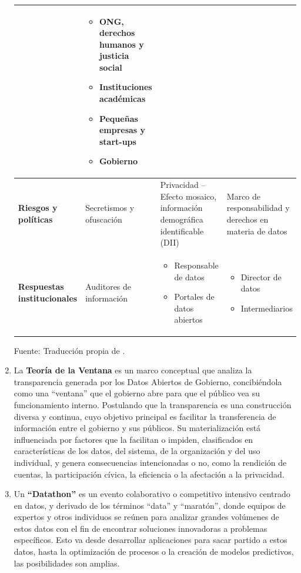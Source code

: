 \begin{enumerate}
\begin{table}[ht]
{\begin{tabular}{|p{3cm}|p{4cm}|p{4cm}|p{5cm}|}
				& 
				\begin{itemize}
					\item ONG, derechos humanos y justicia social
					\item Instituciones académicas
					\item Pequeñas empresas y start-ups
					\item Gobierno
				\end{itemize} \\
				\hline
				\textbf{Riesgos y políticas} & Secretismos y ofuscación & Privacidad -- Efecto mosaico, información demográfica identificable (DII) & Marco de responsabilidad y derechos en materia de datos \\
				\hline
				\textbf{Respuestas institucionales} & Auditores de información & 
				\begin{itemize}
					\item Responsable de datos
					\item Portales de datos abiertos
				\end{itemize}
				& 
				\begin{itemize}
					\item Director de datos
					\item Intermediarios
				\end{itemize} \\
				\hline
			\end{tabular}
		}
		\vspace{0.5em}
		
		\footnotesize Fuente: Traducción propia de \cite{verhulst2020}.
	\end{table}

	\item La \textbf{Teoría de la Ventana} \label{def6} \citep{Matheus03052020} es un marco conceptual que analiza la transparencia generada por los Datos Abiertos de Gobierno, concibiéndola como una ``ventana'' que el gobierno abre para que el público vea su funcionamiento interno. Postulando que la transparencia es una construcción diversa y continua, cuyo objetivo principal es facilitar la transferencia de información entre el gobierno y sus públicos. Su materialización está influenciada por factores que la facilitan o impiden, clasificados en características de los datos, del sistema, de la organización y del uso individual, y genera consecuencias intencionadas o no, como la rendición de cuentas, la participación cívica, la eficiencia o la afectación a la privacidad.
	
	\item Un \textbf{``Datathon''} \label{def7} \citep{Datathon2016Anslow} es un evento colaborativo o competitivo intensivo centrado en datos, y derivado de los términos ``data'' y ``maratón'', donde equipos de expertos y otros individuos se reúnen para analizar grandes volúmenes de estos datos con el fin de encontrar soluciones innovadoras a problemas específicos. Esto va desde desarrollar aplicaciones para sacar partido a estos datos, hasta la optimización de procesos o la creación de modelos predictivos, las posibilidades son amplias.
	

\end{enumerate}
